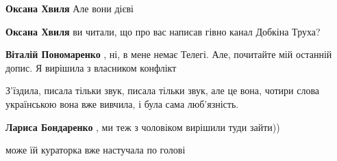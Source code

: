 \begin{itemize}
\begin{itemize}
\textbf{Оксана Хвиля} Але вони дієві

 
\textbf{Оксана Хвиля} ви читали, що про вас написав гівно канал Добкіна Труха?

 
\textbf{Віталій Пономаренко} , ні, в мене немає Телегі. Але, почитайте мій останній допис. Я вирішила з власником конфлікт
\end{itemize}

 
З'їздила, писала тільки звук, писала тільки звук, але це вона, чотири слова
українською вона вже вивчила, і була сама люб'язність.

\begin{itemize}
 
\textbf{Лариса Бондаренко} , ми теж з чоловіком вирішили туди зайти))

 
може їй кураторка вже настучала по голові

 

\end{itemize}
\end{itemize}
